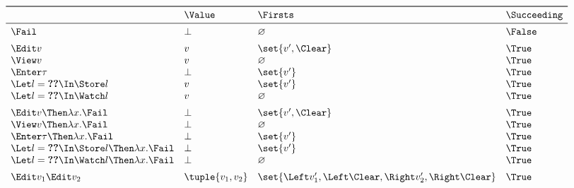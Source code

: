 \begin{equation*}
  \begin{array}{llll}
    \toprule
                                                        & \Value           & \Firsts                                                    & \Succeeding \\
    \midrule
    \Fail                                               & \bot             & \nothing                                                   & \False \\
    \addlinespace
    \Edit v                                             & v                & \set{v', \Clear}                                           & \True \\
    \View v                                             & v                & \nothing                                                   & \True \\
    \Enter \tau                                         & \bot             & \set{v'}                                                   & \True \\
    \Let l = \Ref v \In \Store l                        & v                & \set{v'}                                                   & \True \\
    \Let l = \Ref v \In \Watch l                        & v                & \nothing                                                   & \True \\
    \addlinespace
    \Edit v \Then \lambda x. \Fail                      & \bot             & \set{v', \Clear}                                           & \True \\
    \View v \Then \lambda x. \Fail                      & \bot             & \nothing                                                   & \True \\
    \Enter \tau \Then \lambda x. \Fail                  & \bot             & \set{v'}                                                   & \True \\
    \Let l = \Ref v \In \Store l \Then \lambda x. \Fail & \bot             & \set{v'}                                                   & \True \\
    \Let l = \Ref v \In \Watch l \Then \lambda x. \Fail & \bot             & \nothing                                                   & \True \\
    \addlinespace
    \Edit v_1 \And \Edit v_2                            & \tuple{v_1, v_2} & \set{\Left v_1', \Left \Clear, \Right v_2', \Right \Clear} & \True \\

\end{array}
\end{equation*}
